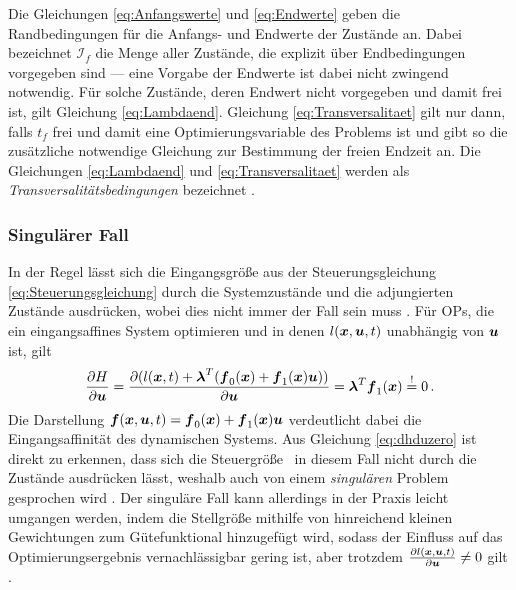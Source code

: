 Die Gleichungen \eqref{eq:Anfangswerte} und \eqref{eq:Endwerte} geben die Randbedingungen für die Anfangs- und Endwerte der Zustände an. Dabei bezeichnet $\mathcal{I}_f$ die Menge aller Zustände, die explizit über Endbedingungen vorgegeben sind --- eine Vorgabe der Endwerte ist dabei nicht zwingend notwendig. Für solche Zustände, deren Endwert nicht vorgegeben und damit frei ist, gilt Gleichung \eqref{eq:Lambdaend}. Gleichung \eqref{eq:Transversalitaet} gilt nur dann, falls $t_f$ frei und damit eine Optimierungsvariable des Problems ist und gibt so die zusätzliche notwendige Gleichung zur Bestimmung der freien Endzeit an. Die Gleichungen \eqref{eq:Lambdaend} und \eqref{eq:Transversalitaet} werden als \textit{Transversalitätsbedingungen} bezeichnet \cite{KnutGraichen.2012}. 
\subsubsection{Singulärer Fall}\label{subsubsec:Singularität}
In der Regel lässt sich die Eingangsgröße aus der Steuerungsgleichung \eqref{eq:Steuerungsgleichung} durch die Systemzustände und die adjungierten Zustände ausdrücken, wobei dies nicht immer der Fall sein muss \cite{KnutGraichen.2012}. Für \gls{OP}s, die ein eingangsaffines System optimieren und in denen $l(\boldsymbol{x},\boldsymbol{u},t)$ unabhängig von $\boldsymbol{u}$ ist, gilt 
\begin{equation}
	\frac{\partial H}{\partial \boldsymbol{u}} = \frac{\partial (l(\boldsymbol{x},t) + \boldsymbol{\lambda}^T(\boldsymbol{f}_0(\boldsymbol{x})+\boldsymbol{f}_1(\boldsymbol{x})\boldsymbol{u}))}{\partial \boldsymbol{u}} = \boldsymbol{\lambda}^T\boldsymbol{f}_1(\boldsymbol{x}) \stackrel{!}{=} 0 \,. \label{eq:dhduzero}
\end{equation}
Die Darstellung $\boldsymbol{f}(\boldsymbol{x},\boldsymbol{u},t) = \boldsymbol{f}_0(\boldsymbol{x})+\boldsymbol{f}_1(\boldsymbol{x})\boldsymbol{u}$ verdeutlicht dabei die Eingangsaffinität des dynamischen Systems. Aus Gleichung \eqref{eq:dhduzero} ist direkt zu erkennen, dass sich die Steuergröße \uoft~in diesem Fall nicht durch die Zustände ausdrücken lässt, weshalb auch von einem \textit{singulären} Problem gesprochen wird \cite{KnutGraichen.2012}. Der singuläre Fall kann allerdings in der Praxis leicht umgangen werden, indem die Stellgröße mithilfe von hinreichend kleinen Gewichtungen zum Gütefunktional hinzugefügt wird, sodass der Einfluss auf das Optimierungsergebnis vernachlässigbar gering ist, aber trotzdem $\frac{\partial l(\boldsymbol{x},\boldsymbol{u},t)}{\partial \boldsymbol{u}} \neq 0$ gilt \cite{KnutGraichen.2012}.
